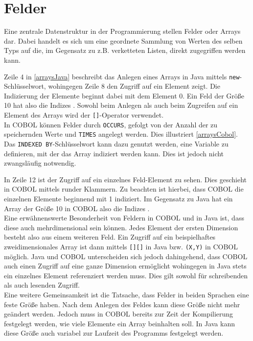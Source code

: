 \section{Felder}
Eine zentrale Datenstruktur in der Programmierung stellen Felder oder Arrays dar. Dabei handelt es sich um eine geordnete Sammlung von Werten des selben Typs auf die, im Gegensatz zu z.B. verketteten Listen, direkt zugegriffen werden kann.\\


Zeile 4 in \autoref{arraysJava} beschreibt das Anlegen eines Arrays in Java mittels \texttt{new}-Schlüsselwort, wohingegen Zeile 8 den Zugriff auf ein Element zeigt. Die Indizierung der Elemente beginnt dabei mit dem Element 0. Ein Feld der Größe 10 hat also die Indizes . Sowohl beim Anlegen als auch beim Zugreifen auf ein Element des Arrays wird der \texttt{[]}-Operator verwendet.\\

In COBOL können Felder durch \texttt{OCCURS}, gefolgt von der Anzahl der zu speichernden Werte und \texttt{TIMES} angelegt werden. Dies illustriert \autoref{arraysCobol}. Das \texttt{INDEXED BY}-Schlüsselwort kann dazu genutzt werden, eine Variable zu definieren, mit der das Array indiziert werden kann. Dies ist jedoch nicht zwangsläufig notwendig.\\


In Zeile 12 ist der Zugriff auf ein einzelnes Feld-Element zu sehen. Dies geschieht in COBOL mittels runder Klammern. Zu beachten ist hierbei, dass COBOL die einzelnen Elemente beginnend mit 1 indiziert. Im Gegensatz zu Java hat ein Array der Größe 10 in COBOL also die Indizes .\\

Eine erwähnenswerte Besonderheit von Feldern in COBOL und in Java ist, dass diese auch mehrdimensional sein können. Jedes Element der ersten Dimension besteht also aus einem weiteren Feld. Ein Zugriff auf ein beispielhaftes zweidimensionales Array ist dann mittels \texttt{[][]} in Java bzw. \texttt{(X,Y)} in COBOL möglich. Java und COBOL unterscheiden sich jedoch dahingehend, dass COBOL auch einen Zugriff auf eine ganze Dimension ermöglicht wohingegen in Java stets ein einzelnes Element referenziert werden muss. Dies gilt sowohl für schreibenden als auch lesenden Zugriff.\\

Eine weitere Gemeinsamkeit ist die Tatsache, dass Felder in beiden Sprachen eine feste Größe haben. Nach dem Anlegen des Feldes kann diese Größe nicht mehr geändert werden. Jedoch muss in COBOL bereits zur Zeit der Kompilierung festgelegt werden, wie viele Elemente ein Array beinhalten soll. In Java kann diese Größe auch variabel zur Laufzeit des Programms festgelegt werden.\\